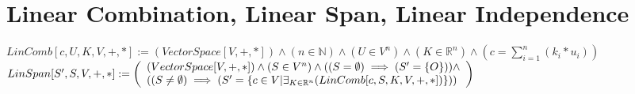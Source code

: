 \documentclass{book}
\newcommand{\abr}{:=}
\newcommand{\pipe}{$\phantom{(}\vrectangleblack\phantom{)}$}
\begin{document}
\begin{comment}
      \begin{enumerate}
        \lit $(a_1 \in A) \land (a_1 = -b_1 \in B)$ \pipe $a_1 \in A \cap B$ \pipe $a_1 = O = b_1$
        \lit $(a_2 \in A) \land (a_2 = -b_2 \in B)$ \pipe $a_2 \in A \cap B$ \pipe $a_2 = O = b_2$
        \lit $\langle a_1, b_1 \rangle = \langle O, O \rangle = \langle a_2, b_2 \rangle$
      \end{enumerate}
      \lit $((\langle a_1, b_1 \rangle, \langle a_2, b_2 \rangle \in A \times B) \land (O = a_1 + b_1) \land (O = a_2 + b_2)) \implies (\langle a_1, b_1 \rangle = \langle a_2, b_2 \rangle)$
      \lit $\forall_{\langle a_1, b_1 \rangle, \langle a_2, b_2 \rangle \in A \times B}(((O = a_1 + b_1) \land (O = a_2 + b_2)) \implies (\langle a_1, b_1 \rangle = \langle a_2, b_2 \rangle))$
      \lit $(\exists_{\langle a, b \rangle \in A \times B}(O = a + b)) \land (\forall_{\langle a_1, b_1 \rangle, \langle a_2, b_2 \rangle \in A \times B}(((O = a_1 + b_1) \land (O = a_2 + b_2)) \implies (\langle a_1, b_1 \rangle = \langle a_2, b_2 \rangle)))$
      \lit $(\exists!_{\langle a, b \rangle \in A \times B}(O = a + b)) \land (DirSumEquiv)$ \pipe $DirSum[A \oplus B, A, B, V, +, *]$
    \end{enumerate}
    \lit $(A \cap B = \{O\}) \implies (DirSum[A \oplus B, A, B, V, +, *])$
    \lit $(DirSum[A \oplus B, A, B, V, +, *]) \iff (A \cap B = \{O\})$
  \end{enumerate} \vspace{.75mm} \hrule \vspace{.75mm} \ \\ 
\end{comment}

\section{Linear Combination, Linear Span, Linear Independence}
$LinComb[c, U, K, V, +, *] \abr (VectorSpace[V, +, *]) \land (n \in \mathbb{N}) \land (U \in V^n) \land (K \in \mathbb{R}^n) \land (c = \sum_{i = 1}^{n}(k_i * u_i))$ \\
$LinSpan[S', S, V, +, *] \abr \left(\begin{array}{ll}
  (VectorSpace[V, +, *]) \land (S \in V^n) \land ((S = \emptyset) \implies (S' = \{O\})) \hfill \land \hfill \\
  ((S \neq \emptyset) \implies (S' = \{c \in V | \exists_{K \in \mathbb{R}^n}(LinComb[c, S, K, V, +, *])\}))
\end{array}\right)$ \\
\end{document}
